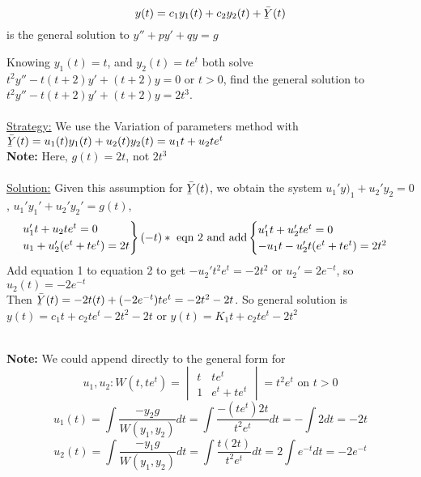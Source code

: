 \begin{equation*}
	y(t) = c_1y_1(t) + c_2y_2(t) + \Ylines(t)
\end{equation*}
is the general solution to $y'' + py' + qy = g$
\begin{example-N}
	Knowing $y_1(t) = t$, and $y_2(t) = te^t$ both solve $t^2y'' - t(t + 2)y' + (t+2)y = 0$ or $t > 0$, find the general solution to $t^2y'' - t(t + 2)y' + (t+2)y = 2t^3$.\\\\
\underline{Strategy:} We use the Variation of parameters method with $\Ylines(t) = u_1(t)y_1(t) + u_2(t)y_2(t) = u_1t + u_2te^t$\\
\textbf{Note:} Here, $g(t) = 2t$, not $2t^3$\\\\
\underline{Solution:} Given this assumption for $\Ylines(t)$, we obtain the system $u_1'y)_1 + u_2'y_2 = 0$, $u_1'y_1' + u_2'y_2' = g(t)$,
\begin{equation*}
	\begin{rcases}
		u_1't + u_2te^t = 0\\
		u_1 + u_2'(e^t + te^t) = 2t
	\end{rcases} (-t)* \text{ eqn 2 and add}
	\begin{cases}
		u_1't + u_2'te^t = 0\\
		-u_1t - u_2't(e^t+te^t) = 2t^2
	\end{cases}
\end{equation*}
Add equation 1 to equation 2 to get $-u_2't^2e^t = -2t^2$ or $u_2' = 2e^{-t}$, so $\boxed{u_2(t) = -2e^{-t}}$\\
Then $\Ylines(t) = -2t(t) + (-2e^{-t})te^t = -2t^2 - 2t$. So general solution is $y(t) = c_1t + c_2te^t - 2t^2 - 2t$ or $\boxed{y(t) = K_1t + c_2te^t - 2t^2}$
\end{example-N}
\redhline\\
\textbf{Note:} We could append directly to the general form for
\begin{equation*}
	u_1, u_2: W(t, te^t) = 
	\begin{vmatrix}
		t & te^t\\
		1 & e^t + te^t
	\end{vmatrix}
	= t^2e^t \text{ on } t > 0
\end{equation*}
\begin{equation*}
	u_1(t) = \int \dfrac{-y_2g}{W(y_1, y_2)} dt = \int \frac{-(te^t)2t}{t^2e^t} dt = -\int 2dt = -2t
\end{equation*}
\begin{equation*}
	u_2(t) = \int \dfrac{-y_1g}{W(y_1, y_2)} dt = \int \frac{t(2t)}{t^2e^t} dt = 2\int e^{-t} dt = -2e^{-t}
\end{equation*}
